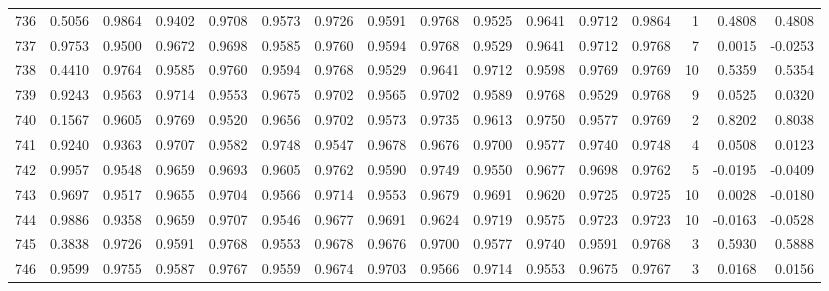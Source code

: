 \begin{tabular}{lrrrrrrrrrrrrrrr}
736 &      0.5056 &  0.9864 &  0.9402 &  0.9708 &  0.9573 &  0.9726 &  0.9591 &  0.9768 &  0.9525 &  0.9641 &   0.9712 &     0.9864 &      1 &                    0.4808 &                     0.4808 \\
737 &      0.9753 &  0.9500 &  0.9672 &  0.9698 &  0.9585 &  0.9760 &  0.9594 &  0.9768 &  0.9529 &  0.9641 &   0.9712 &     0.9768 &      7 &                    0.0015 &                    -0.0253 \\
738 &      0.4410 &  0.9764 &  0.9585 &  0.9760 &  0.9594 &  0.9768 &  0.9529 &  0.9641 &  0.9712 &  0.9598 &   0.9769 &     0.9769 &     10 &                    0.5359 &                     0.5354 \\
739 &      0.9243 &  0.9563 &  0.9714 &  0.9553 &  0.9675 &  0.9702 &  0.9565 &  0.9702 &  0.9589 &  0.9768 &   0.9529 &     0.9768 &      9 &                    0.0525 &                     0.0320 \\
740 &      0.1567 &  0.9605 &  0.9769 &  0.9520 &  0.9656 &  0.9702 &  0.9573 &  0.9735 &  0.9613 &  0.9750 &   0.9577 &     0.9769 &      2 &                    0.8202 &                     0.8038 \\
741 &      0.9240 &  0.9363 &  0.9707 &  0.9582 &  0.9748 &  0.9547 &  0.9678 &  0.9676 &  0.9700 &  0.9577 &   0.9740 &     0.9748 &      4 &                    0.0508 &                     0.0123 \\
742 &      0.9957 &  0.9548 &  0.9659 &  0.9693 &  0.9605 &  0.9762 &  0.9590 &  0.9749 &  0.9550 &  0.9677 &   0.9698 &     0.9762 &      5 &                   -0.0195 &                    -0.0409 \\
743 &      0.9697 &  0.9517 &  0.9655 &  0.9704 &  0.9566 &  0.9714 &  0.9553 &  0.9679 &  0.9691 &  0.9620 &   0.9725 &     0.9725 &     10 &                    0.0028 &                    -0.0180 \\
744 &      0.9886 &  0.9358 &  0.9659 &  0.9707 &  0.9546 &  0.9677 &  0.9691 &  0.9624 &  0.9719 &  0.9575 &   0.9723 &     0.9723 &     10 &                   -0.0163 &                    -0.0528 \\
745 &      0.3838 &  0.9726 &  0.9591 &  0.9768 &  0.9553 &  0.9678 &  0.9676 &  0.9700 &  0.9577 &  0.9740 &   0.9591 &     0.9768 &      3 &                    0.5930 &                     0.5888 \\
746 &      0.9599 &  0.9755 &  0.9587 &  0.9767 &  0.9559 &  0.9674 &  0.9703 &  0.9566 &  0.9714 &  0.9553 &   0.9675 &     0.9767 &      3 &                    0.0168 &                     0.0156 \\

\end{tabular}
